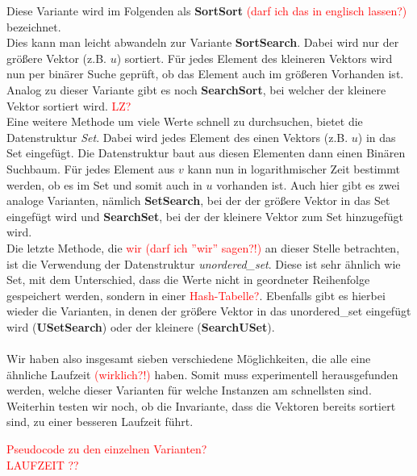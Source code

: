 \documentclass[a4paper]{scrreprt}
\theoremstyle{plain} %
\theoremstyle{definition} %
\begin{document}
Diese Variante wird im Folgenden als \textbf{SortSort} \textcolor{red}{(darf ich das in
englisch lassen?)} bezeichnet.
\\
Dies kann man leicht abwandeln zur Variante \textbf{SortSearch}. Dabei wird nur der größere Vektor (z.B. $u$)
sortiert.
Für jedes Element des kleineren Vektors wird nun per binärer Suche geprüft, ob das Element auch im 
größeren Vorhanden ist. Analog zu dieser Variante gibt es noch \textbf{SearchSort}, bei welcher 
der kleinere Vektor sortiert wird. \textcolor{red}{LZ?}
\\
Eine weitere Methode um  viele Werte schnell zu durchsuchen, bietet die Datenstruktur \textit{Set}.
Dabei wird jedes Element des einen Vektors (z.B. $u$) in das Set eingefügt. Die Datenstruktur
baut aus diesen Elementen dann einen Binären Suchbaum. Für jedes Element aus $v$ kann nun in logarithmischer
Zeit bestimmt werden, ob es im Set und somit auch in $u$ vorhanden ist. Auch hier gibt es zwei
analoge Varianten, nämlich \textbf{SetSearch}, bei der der größere Vektor in das Set eingefügt wird
und \textbf{SearchSet}, bei der der kleinere Vektor zum Set hinzugefügt wird.
\\
Die letzte Methode, die \textcolor{red}{wir (darf ich ''wir'' sagen?!)} an dieser Stelle betrachten,
ist die Verwendung der Datenstruktur \textit{unordered\_set}. Diese ist sehr ähnlich wie Set, mit
dem Unterschied, dass die Werte nicht in geordneter Reihenfolge gespeichert werden, sondern
in einer \textcolor{red}{Hash-Tabelle?}. Ebenfalls gibt es hierbei wieder die Varianten, 
in denen der größere Vektor in das unordered\_set eingefügt wird (\textbf{USetSearch}) 
oder der kleinere (\textbf{SearchUSet}).
\\
\\
Wir haben also insgesamt sieben verschiedene Möglichkeiten, die alle eine ähnliche Laufzeit \textcolor{red}{(wirklich?!)}
haben. Somit muss experimentell herausgefunden werden, welche dieser Varianten für welche Instanzen am
schnellsten sind. Weiterhin testen wir noch, ob die Invariante, dass die Vektoren bereits 
sortiert sind, zu einer besseren Laufzeit führt.


\textcolor{red}{Pseudocode zu den einzelnen Varianten?}\\
\textcolor{red}{LAUFZEIT ??}
\end{document}
